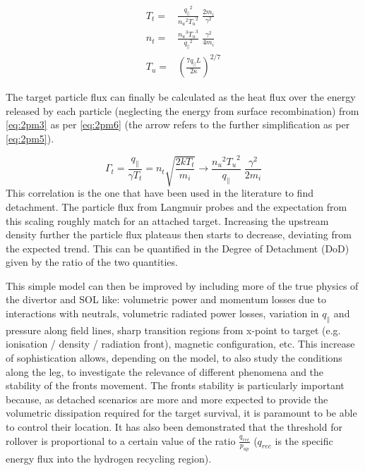 \begin{equation}
\begin{aligned}
T_t =& \frac{{q_{\parallel}}^2}{{n_u}^2 {T_u}^2} \; \frac{2m_i}{\gamma^2} \\
n_t =& \frac{{n_u}^3 {T_u}^3}{{q_{\parallel}}^2} \; \frac{\gamma^2}{4m_i} \\
T_u =& \left( \frac{7 q_{\parallel} L}{2 \kappa} \right)^{2/7}
\end{aligned}
\label{eq:2pm5}
\end{equation}

The target particle flux can finally be calculated as the heat flux over the energy released by each particle (neglecting the energy from surface recombination) from \autoref{eq:2pm3} as per \autoref{eq:2pm6} (the arrow refers to the further simplification as per \autoref{eq:2pm5}).

\begin{equation}
\Gamma_t = \frac{q_{\parallel}}{\gamma T_t} =  n_t \sqrt{\frac{2kT_t}{m_i}} \rightarrow \frac{{n_u}^2 {T_u}^2}{q_{\parallel}} \; \frac{\gamma^2}{2m_i}
\label{eq:2pm6}
\end{equation}
This correlation is the one that have been used in the literature to find detachment. The particle flux from Langmuir probes and the expectation from this scaling roughly match for an attached target. Increasing the upstream density further the particle flux plateaus then starts to decrease, deviating from the expected trend. This can be quantified in the Degree of Detachment (DoD) given by the ratio of the two quantities.\cite{Stangeby2001,Loarte1998}

This simple model can then be improved by including more of the true physics of the divertor and SOL like: volumetric power and momentum losses due to interactions with neutrals, volumetric radiated power losses, variation in $q_{\parallel}$ and pressure along field lines, sharp transition regions from x-point to target (e.g. ionisation / density / radiation front), magnetic configuration, etc.\cite{Stangeby2001,Cowley2022,Reinke2017,Lipschultz2016} This increase of sophistication allows, depending on the model, to also study the conditions along the leg, to investigate the relevance of different phenomena and the stability of the fronts movement. The fronts stability is particularly important because, as detached scenarios are more and more expected to provide the volumetric dissipation required for the target survival, it is paramount to be able to control their location. It has also been demonstrated that the threshold for rollover is proportional to a certain value of the ratio $ \frac {q_{rec}} {p_{up}}$ ($q_{rec}$ is the speciﬁc energy ﬂux into the hydrogen recycling region). \cite{Krasheninnikov1999,Krasheninnikov2016,Stangeby2018}

